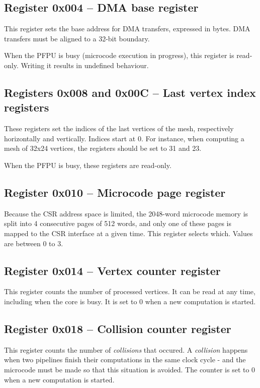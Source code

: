 \documentclass[a4paper,11pt]{article}
\begin{document}
\subsection{Register 0x004 -- DMA base register}
This register sets the base address for DMA transfers, expressed in bytes. DMA transfers must be aligned to a 32-bit boundary.

When the PFPU is busy (microcode execution in progress), this register is read-only. Writing it results in undefined behaviour.

\subsection{Registers 0x008 and 0x00C -- Last vertex index registers}
These registers set the indices of the last vertices of the mesh, respectively horizontally and vertically. Indices start at 0. For instance, when computing a mesh of 32x24 vertices, the registers should be set to 31 and 23.

When the PFPU is busy, these registers are read-only.

\subsection{Register 0x010 -- Microcode page register}
Because the CSR address space is limited, the 2048-word microcode memory is split into 4 consecutive pages of 512 words, and only one of these pages is mapped to the CSR interface at a given time. This register selects which. Values are between 0 to 3.

\subsection{Register 0x014 -- Vertex counter register}
This register counts the number of processed vertices. It can be read at any time, including when the core is busy. It is set to 0 when a new computation is started.

\subsection{Register 0x018 -- Collision counter register}
This register counts the number of \textit{collisions} that occured. A \textit{collision} happens when two pipelines finish their computations in the same clock cycle - and the microcode must be made so that this situation is avoided. The counter is set to 0 when a new computation is started.
\end{document}

